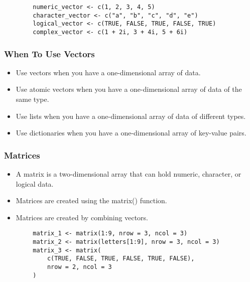 \documentclass[serif, 9pt, aspectratio=32]{beamer}
\begin{document}
\begin{frame}[fragile]
    \begin{lstlisting}
        numeric_vector <- c(1, 2, 3, 4, 5)
        character_vector <- c("a", "b", "c", "d", "e")
        logical_vector <- c(TRUE, FALSE, TRUE, FALSE, TRUE)
        complex_vector <- c(1 + 2i, 3 + 4i, 5 + 6i)
    \end{lstlisting}
\end{frame}

\begin{frame}
    \centering
    \frametitle{When To Use Vectors}
    \begin{itemize}
        \setlength{\itemsep}{2em}
        \item Use vectors when you have a one-dimensional array of data.
        \item Use atomic vectors when you have a one-dimensional array of data of the same type.
        \item Use lists when you have a one-dimensional array of data of different types.
        \item Use dictionaries when you have a one-dimensional array of key-value pairs.
    \end{itemize}
\end{frame}

\begin{frame}
    \centering
    \frametitle{Matrices}
    \begin{itemize}
        \setlength{\itemsep}{2em}
        \item A matrix is a two-dimensional array that can hold numeric, character, or logical data.
        \item Matrices are created using the matrix() function.
        \item Matrices are created by combining vectors.
    \end{itemize}
\end{frame}

\begin{frame}[fragile]
    \begin{lstlisting}
        matrix_1 <- matrix(1:9, nrow = 3, ncol = 3)
        matrix_2 <- matrix(letters[1:9], nrow = 3, ncol = 3)
        matrix_3 <- matrix(
            c(TRUE, FALSE, TRUE, FALSE, TRUE, FALSE),
            nrow = 2, ncol = 3
        )
    \end{lstlisting}
\end{frame}
\end{document}
